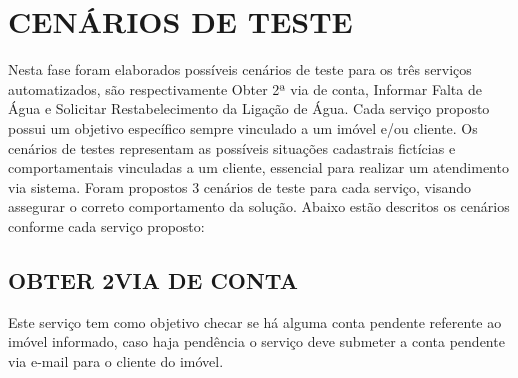 \section{\textbf{\uppercase{Cenários de Teste}}}
Nesta fase foram elaborados possíveis cenários de teste para os três serviços automatizados, são respectivamente Obter 2ª via de conta, Informar Falta de Água e Solicitar Restabelecimento da Ligação de Água. Cada serviço proposto possui um objetivo específico sempre vinculado a um imóvel e/ou cliente.
Os cenários de testes representam as possíveis situações cadastrais fictícias e comportamentais vinculadas a um cliente, essencial para realizar um atendimento via sistema. Foram propostos 3 cenários de teste para cada serviço, visando assegurar o correto comportamento da solução. Abaixo estão descritos os cenários conforme cada serviço proposto:

\subsection{\textbf{\uppercase{Obter 2\textordfeminine \space Via de Conta}}}
Este serviço tem como objetivo checar se há alguma conta pendente referente ao imóvel informado, caso haja pendência o serviço deve submeter a conta pendente via e-mail para o cliente do imóvel. 

